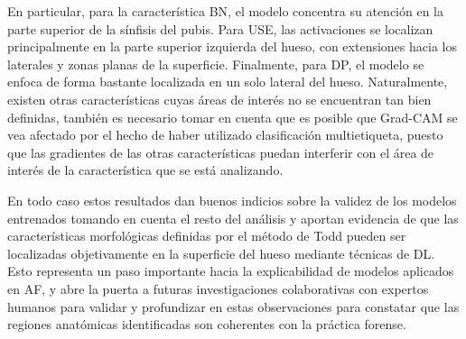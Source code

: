 En particular, para la característica BN, el modelo concentra su atención en la parte superior de la sínfisis del pubis. Para USE, las activaciones se localizan principalmente en la parte superior izquierda del hueso, con extensiones hacia los laterales y zonas planas de la superficie. Finalmente, para DP, el modelo se enfoca de forma bastante localizada en un solo lateral del hueso. Naturalmente, existen otras características cuyas áreas de interés no se encuentran tan bien definidas, también es necesario tomar en cuenta que es posible que Grad-CAM se vea afectado por el hecho de haber utilizado clasificación multietiqueta, puesto que las gradientes de las otras características puedan interferir con el área de interés de la característica que se está analizando.

En todo caso estos resultados dan buenos indicios sobre la validez de los modelos entrenados tomando en cuenta el resto del análisis y aportan evidencia de que las características morfológicas definidas por el método de Todd pueden ser localizadas objetivamente en la superficie del hueso mediante técnicas de DL. Esto representa un paso importante hacia la explicabilidad de modelos aplicados en AF, y abre la puerta a futuras investigaciones colaborativas con expertos humanos para validar y profundizar en estas observaciones para constatar que las regiones anatómicas identificadas son coherentes con la práctica forense.

